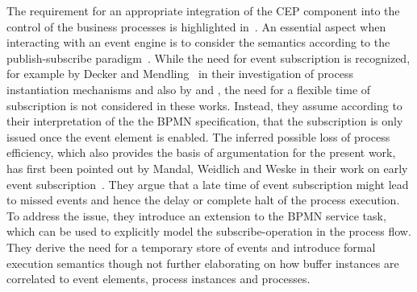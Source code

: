 The requirement for an appropriate integration of the CEP component into the control of the business processes is highlighted in~\cite{chandy2010event}.
An essential aspect when interacting with an event engine is to consider the semantics according to the publish-subscribe paradigm~\cite{luckham2008power}. 
While the need for event subscription is recognized, for example by Decker and Mendling~\cite{decker2008instantiation} in their investigation of process instantiation mechanisms and also by \cite{Pufahl2017} and \cite{von2010integrating}, the need for a flexible time of subscription is not considered in these works.
Instead, they assume according to their interpretation of the the \acs{BPMN} specification, that the subscription is only issued once the event element is enabled.
The inferred possible loss of process efficiency, which also provides the basis of argumentation for the present work, has first been pointed out by Mandal, Weidlich and Weske in their work on early event subscription~\cite{mandal:2017}.
They argue that a late time of event subscription might lead to missed events and hence the delay or complete halt of the process execution. To address the issue, they introduce an extension to the BPMN service task, which can be used to explicitly model the subscribe-operation in the process flow. They derive the need for a temporary store of events and introduce formal execution semantics though not further elaborating on how buffer instances are correlated to event elements, process instances and processes.

